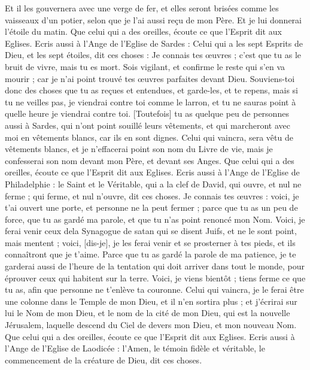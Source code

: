 \begin{multicols}{2}
Et il les gouvernera avec une verge de fer, et elles seront brisées comme les vaisseaux d'un potier, selon que je l'ai aussi reçu de mon Père.
Et je lui donnerai l'étoile du matin.
Que celui qui a des oreilles, écoute ce que l'Esprit dit aux Eglises.
\VerseOne{}Ecris aussi à l'Ange de l'Eglise de Sardes : Celui qui a les sept Esprits de Dieu, et les sept étoiles, dit ces choses : Je connais tes œuvres ; c'est que tu as le bruit de vivre, mais tu es mort.
Sois vigilant, et confirme le reste qui s'en va mourir ; car je n'ai point trouvé tes œuvres parfaites devant Dieu.
Souviens-toi donc des choses que tu as reçues et entendues, et garde-les, et te repens, mais si tu ne veilles pas, je viendrai contre toi comme le larron, et tu ne sauras point à quelle heure je viendrai contre toi.
[Toutefois] tu as quelque peu de personnes aussi à Sardes, qui n'ont point souillé leurs vêtements, et qui marcheront avec moi en vêtements blancs, car ils en sont dignes.
Celui qui vaincra, sera vêtu de vêtements blancs, et je n'effacerai point son nom du Livre de vie, mais je confesserai son nom devant mon Père, et devant ses Anges.
Que celui qui a des oreilles, écoute ce que l'Esprit dit aux Eglises.
Ecris aussi à l'Ange de l'Eglise de Philadelphie : le Saint et le Véritable, qui a la clef de David, qui ouvre, et nul ne ferme ; qui ferme, et nul n'ouvre, dit ces choses.
Je connais tes œuvres : voici, je t'ai ouvert une porte, et personne ne la peut fermer ; parce que tu as un peu de force, que tu as gardé ma parole, et que tu n'as point renoncé mon Nom.
Voici, je ferai venir ceux dela Synagogue de satan qui se disent Juifs, et ne le sont point, mais mentent ; voici, [dis-je], je les ferai venir et se prosterner à tes pieds, et ils connaîtront que je t'aime.
Parce que tu as gardé la parole de ma patience, je te garderai aussi de l'heure de la tentation qui doit arriver dans tout le monde, pour éprouver ceux qui habitent sur la terre.
Voici, je viens bientôt ; tiens ferme ce que tu as, afin que personne ne t'enlève ta couronne.
Celui qui vaincra, je le ferai être une colonne dans le Temple de mon Dieu, et il n'en sortira plus ; et j'écrirai sur lui le Nom de mon Dieu, et le nom de la cité de mon Dieu, qui est la nouvelle Jérusalem, laquelle descend du Ciel de devers mon Dieu, et mon nouveau Nom.
Que celui qui a des oreilles, écoute ce que l'Esprit dit aux Eglises.
Ecris aussi à l'Ange de l'Eglise de Laodicée : l'Amen, le témoin fidèle et véritable, le commencement de la créature de Dieu, dit ces choses.

\end{multicols}
